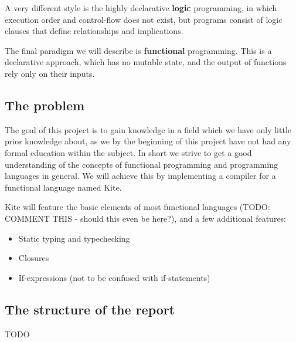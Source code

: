 A very different style is the highly declarative \textbf{logic} programming, in which execution order and control-flow does not exist, but programs consist of logic clauses that define relationships and implications.

The final paradigm we will describe is \textbf{functional} programming. This is a declarative approach, which has no mutable state, and the output of functions rely only on their inputs.

\subsection{The problem}
The goal of this project is to gain knowledge in a field which we have only little prior knowledge about, as we by the beginning of this project have not had any formal education within the subject. In short we strive to get a good understanding of the concepts of functional programming and programming languages in general. We will achieve this by implementing a compiler for a functional language named Kite.

Kite will feature the basic elements of most functional languages (TODO: COMMENT THIS - should this even be here?), and a few additional features:

\begin{itemize}

\item Static typing and typechecking
\item Closures
\item If-expressions (not to be confused with if-statements)

\end{itemize}

\subsection{The structure of the report}
TODO
